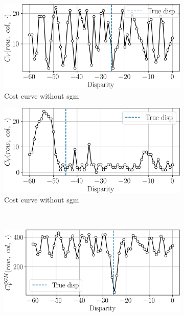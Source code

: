 \begin{figure}
    \begin{subfigure}[t]{0.49\linewidth}
        \flushleft
        \includegraphics[width=\linewidth]{Images/Chap_1/cost_curve_no_sgm_row_100_col_250.png}
        \caption{Cost curve without \acrshort{sgm}}
        \label{fig:cost_curve_no_sgm_row_100_col_250}
    \end{subfigure}\hfill
    \begin{subfigure}[t]{0.49\linewidth}
        \flushright
        \includegraphics[width=\linewidth]{Images/Chap_1/cost_curve_no_sgm_row_276_col_360.png}
        \caption{Cost curve without \acrshort{sgm}}
        \label{fig:cost_curve_no_sgm_row_276_col_360}
    \end{subfigure}\\
    \begin{subfigure}[t]{0.49\linewidth}
        \flushleft
        \includegraphics[width=\linewidth]{Images/Chap_1/cost_curve_sgm_row_100_col_250.png}

\end{subfigure}
\end{figure}
